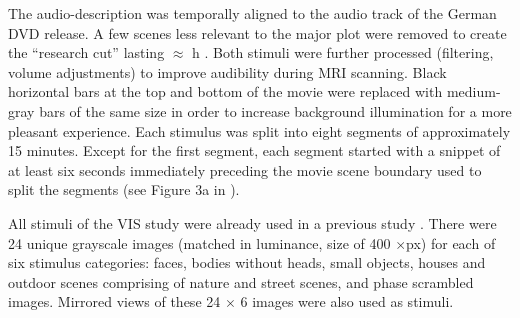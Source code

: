 \documentclass[english]{article}
\begin{document}
The audio-description was temporally aligned to the audio track of the German
DVD release. A few scenes less relevant to the major plot were removed to create
the ``research cut'' lasting $\approx$ \unit[2]{h} \citep{hanke2014audiomovie,
hanke2016simultaneous}.
Both stimuli were further processed (filtering, volume adjustments) to improve
audibility during MRI scanning. Black horizontal bars at the top and bottom of
the movie were replaced with medium-gray bars of the same size in order to
increase background illumination for a more pleasant experience.
Each stimulus was split into eight segments of approximately 15 minutes. Except
for the first segment, each segment started with a snippet of at least six
seconds immediately preceding the movie scene boundary used to split the
segments (see Figure 3a in \citep{hanke2014audiomovie}).

All stimuli of the VIS study were already used in a previous study
\citep{haxby2011common}. There were 24 unique grayscale images (matched in
luminance, size of 400 $\times$\unit[400]{px}) for each of six stimulus
categories: faces, bodies without heads, small objects, houses and
outdoor scenes comprising of nature and street scenes, and phase scrambled
images. Mirrored views of these 24 $\times$ 6 images were also used as stimuli.
\end{document}
